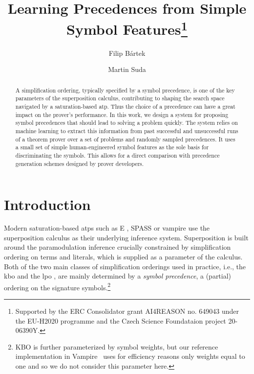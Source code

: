 

\title{Learning Precedences from Simple Symbol Features\thanks{Supported by the ERC Consolidator grant AI4REASON no. 649043 under the EU-H2020 programme and the Czech Science Foundataion project 20-06390Y.}}
\author{Filip B\'{a}rtek \and Martin Suda}



\maketitle

\begin{abstract}
A simplification ordering, typically specified by a symbol precedence,
is one of the key parameters of the superposition calculus, contributing
to shaping the search space navigated by a saturation-based \acrlong*{atp}.
Thus the choice of a precedence can have a great impact on the prover's performance.
In this work, we design a system for proposing symbol precedences
that should lead to solving a problem quickly.
The system relies on machine learning to extract this information from
past successful and unsuccessful runs of a theorem prover over a set of problems and randomly sampled precedences.
It uses a small set of simple human-engineered symbol features as the sole
basis for discriminating the symbols. This allows for a direct comparison
with precedence generation schemes designed by prover developers.
\end{abstract}

\section{Introduction}

Modern saturation-based \glspl*{atp} such as E \cite{SCV:CADE-2019}, SPASS \cite{DBLP:conf/cade/WeidenbachDFKSW09} 
or \gls*{vampire} \cite{Kovacs2013}
use the superposition calculus \cite{Nieuwenhuis2001} as their underlying inference system.
Superposition is built around the paramodulation inference \cite{Robinson1983} crucially
constrained by simplification ordering on terms and literals, which is supplied as a parameter of the calculus.
Both of the two main classes of simplification orderings used in practice,
i.e., the \acrlong*{kbo} \cite{Knuth1983}
and the \acrlong*{lpo} \cite{Kamin1980},
are mainly determined by a %
\emph{symbol precedence}, a (partial) ordering on the signature symbols.\footnote{
KBO is further parameterized by symbol weights, but our reference implementation in Vampire~\cite{Kovacs2013} 
uses for efficiency reasons only weights equal to one \cite{DBLP:conf/cade/KovacsMV11} and so we do not consider this parameter here.}

